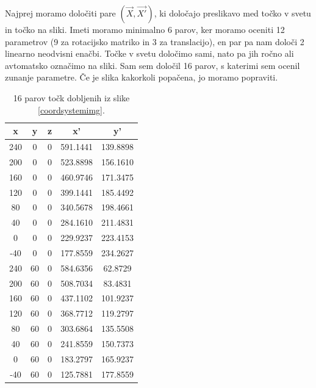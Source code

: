 \documentclass[a4paper, 12pt]{book}
\begin{document}
Najprej moramo določiti pare $(\vec{X}, \vec{X'})$, ki določajo preslikavo med točko v svetu in točko na sliki. Imeti moramo minimalno 6 parov, ker moramo oceniti 12 parametrov (9 za rotacijsko matriko in 3 za translacijo), en par pa nam določi 2 linearno neodvisni enačbi. Točke v svetu določimo sami, nato pa jih ročno ali avtomatsko označimo na sliki. Sam sem določil 16 parov, s katerimi sem ocenil zunanje parametre. Če je slika kakorkoli popačena, jo moramo popraviti.

\begin{table}[H]
\centering
\begin{tabular}{| c | c | c | c | c |}
\hline
x & y & z & x' & y' \\
\hline
240 & 0 & 0 & 591.1441 & 139.8898 \\
200 & 0 & 0 & 523.8898 & 156.1610 \\
160 & 0 & 0 & 460.9746 & 171.3475 \\
120 & 0 & 0 & 399.1441 & 185.4492 \\
80 & 0 & 0 & 340.5678 & 198.4661 \\
40 & 0 & 0 & 284.1610 & 211.4831 \\
0 & 0 & 0 & 229.9237 & 223.4153 \\
-40 & 0 & 0 & 177.8559 & 234.2627 \\
240 & 60 & 0 & 584.6356 & 62.8729 \\
200 & 60 & 0 & 508.7034 & 83.4831 \\
160 & 60 & 0 & 437.1102 & 101.9237 \\
120 & 60 & 0 & 368.7712 & 119.2797 \\
80 & 60 & 0 & 303.6864 & 135.5508 \\
40 & 60 & 0 & 241.8559 & 150.7373 \\
0 & 60 & 0 & 183.2797 & 165.9237 \\
-40 & 60 & 0 & 125.7881 & 177.8559 \\
\hline
\end{tabular}
\caption{16 parov točk dobljenih iz slike \ref{coordsystemimg}.}
\label{pointpairs}
\end{table}
\end{document}
